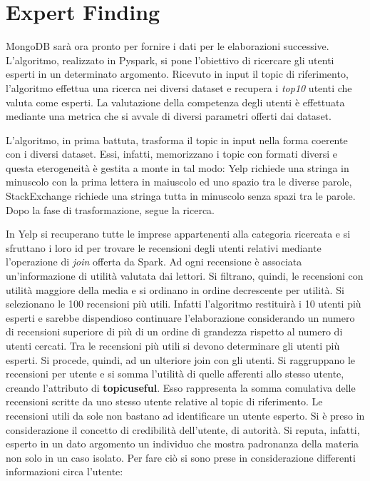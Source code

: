 \section{Expert Finding}
MongoDB sarà ora pronto per fornire i dati per le elaborazioni successive. L'algoritmo, realizzato in Pyspark, si pone l'obiettivo di ricercare gli utenti esperti in un determinato argomento. Ricevuto in input il topic di riferimento, l'algoritmo effettua una ricerca nei diversi dataset e recupera i \emph{top10} utenti che valuta come esperti. La valutazione della competenza degli utenti è effettuata mediante una metrica che si avvale di diversi parametri offerti dai dataset.\par
L'algoritmo, in prima battuta, trasforma il topic in input nella forma coerente con i diversi dataset. Essi, infatti, memorizzano i topic con formati diversi e questa eterogeneità è gestita a monte in tal modo: Yelp richiede una stringa in minuscolo con la prima lettera in maiuscolo ed uno spazio tra le diverse parole, StackExchange richiede una stringa tutta in minuscolo senza spazi tra le parole. Dopo la fase di trasformazione, segue la ricerca.\par 
In Yelp si recuperano tutte le imprese appartenenti alla categoria ricercata e si sfruttano i loro id per trovare le recensioni degli utenti relativi mediante l'operazione di \emph{join} offerta da Spark. Ad ogni recensione è associata un'informazione di utilità valutata dai lettori. Si filtrano, quindi, le recensioni con utilità maggiore della media e si ordinano in ordine decrescente per utilità. Si selezionano le 100 recensioni più utili. Infatti l'algoritmo restituirà i 10 utenti più esperti e sarebbe dispendioso continuare l'elaborazione considerando un numero di recensioni superiore di più di un ordine di grandezza rispetto al numero di utenti cercati. Tra le recensioni più utili si devono determinare gli utenti più esperti. Si procede, quindi, ad un ulteriore join con gli utenti. Si raggruppano le recensioni per utente e si somma l'utilità di quelle afferenti allo stesso utente, creando l'attributo di \textbf{topicuseful}. Esso rappresenta la somma comulativa delle recensioni scritte da uno stesso utente relative al topic di riferimento. Le recensioni utili da sole non bastano ad identificare un utente esperto. Si è preso in considerazione il concetto di credibilità dell'utente, di autorità. Si reputa, infatti, esperto in un dato argomento un individuo che mostra padronanza della materia non solo in un caso isolato.  Per fare ciò si sono prese in considerazione differenti informazioni circa l'utente:
